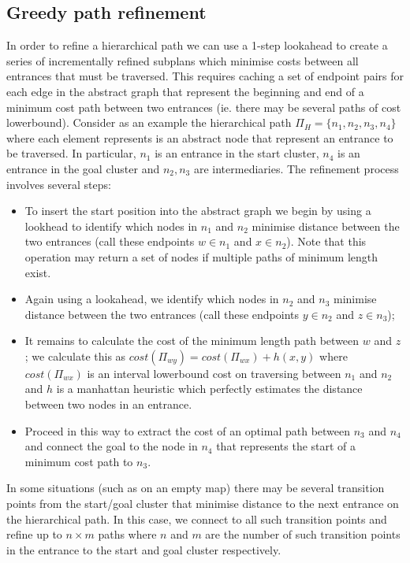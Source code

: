 \subsection{Greedy path refinement}
In order to refine a hierarchical path we can use a 1-step lookahead to create a series of incrementally refined subplans which minimise costs between all entrances that must be traversed.
This requires caching a set of endpoint pairs for each edge in the abstract graph that represent the beginning and end of a minimum cost path between two entrances (ie. there may be several paths of cost lowerbound).
Consider as an example the hierarchical path $\Pi_{H} = \lbrace n_{1}, n_{2}, n_{3}, n_{4} \rbrace$ where each element represents is an abstract node that represent an entrance to be traversed.
In particular, $n_{1}$ is an entrance in the start cluster, $n_{4}$ is an entrance in the goal cluster and $n_{2}, n_{3}$ are intermediaries. 
The refinement process involves several steps:
\begin{itemize}
\item{To insert the start position into the abstract graph we begin by using a lookhead to identify which nodes in $n_{1}$  and $n_{2}$ minimise distance between the two entrances (call these endpoints $w \in n_{1}$ and $x \in n_{2}$). 
Note that this operation may return a set of nodes if multiple paths of minimum length exist.}
\item{Again using a lookahead, we identify which nodes in $n_{2}$ and $n_{3}$ minimise distance between the two entrances (call these endpoints $y \in n_{2}$ and $z \in n_{3}$);}
\item{It remains to calculate the cost of the minimum length path between $w$ and $z$; we calculate this as $cost(\Pi_{wy}) = cost(\Pi_{wx}) + h(x, y)$ where $cost(\Pi_{wx})$ is an interval lowerbound cost on traversing between $n_{1}$ and $n_{2}$ and $h$ is a manhattan heuristic which perfectly estimates the distance between two nodes in an entrance.  }
\item{Proceed in this way to extract the cost of an optimal path between $n_{3}$ and $n_{4}$ and connect the goal to the node in $n_{4}$ that represents the start of a minimum cost path to $n_{3}$. }
\end{itemize}
In some situations (such as on an empty map) there may be several transition points from the start/goal cluster that minimise distance to the next entrance on the hierarchical path. 
In this case, we connect to all such transition points and refine up to $n \times m$ paths where $n$ and $m$ are the number of such transition points in the entrance to the start and goal cluster respectively.

